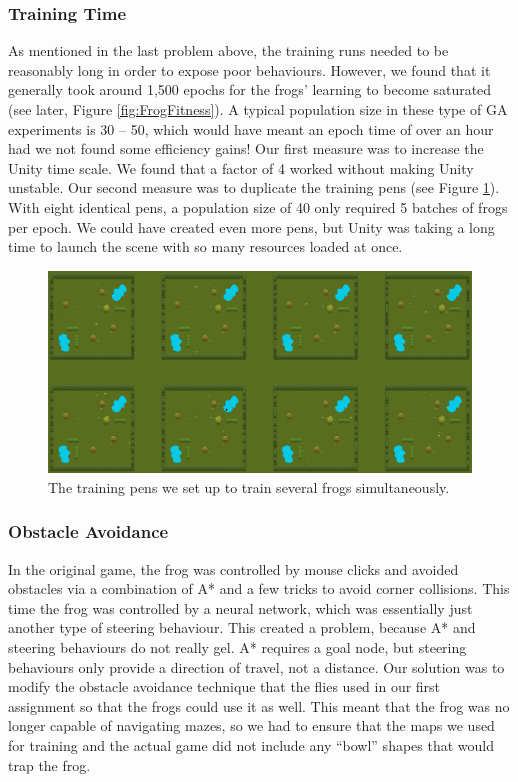 \subsubsection{Training Time}
As mentioned in the last problem above, the training runs needed to be reasonably long in order to expose poor behaviours. However, we found that it generally took around 1,500 epochs for the frogs' learning to become saturated (see later, Figure \ref{fig:FrogFitness}). A typical population size in these type of GA experiments is 30 -- 50, which would have meant an epoch time of over an hour had we not found some efficiency gains! Our first measure was to increase the Unity time scale. We found that a factor of 4 worked without making Unity unstable. Our second measure was to duplicate the training pens (see Figure \ref{fig:TrainingPens}). With eight identical pens, a population size of 40 only required 5 batches of frogs per epoch. We could have created even more pens, but Unity was taking a long time to launch the scene with so many resources loaded at once.

\begin{figure}[!htbp]
    \centering
    \includegraphics[scale=0.3]{Figs/TrainingPens.png}
    \caption{The training pens we set up to train several frogs simultaneously.}
    \label{fig:TrainingPens}
\end{figure}

\subsubsection{Obstacle Avoidance}
In the original game, the frog was controlled by mouse clicks and avoided obstacles via a combination of A* and a few tricks to avoid corner collisions. This time the frog was controlled by a neural network, which was essentially just another type of steering behaviour. This created a problem, because A* and steering behaviours do not really gel. A* requires a goal node, but steering behaviours only provide a direction of travel, not a distance. Our solution was to modify the obstacle avoidance technique that the flies used in our first assignment so that the frogs could use it as well. This meant that the frog was no longer capable of navigating mazes, so we had to ensure that the maps we used for training and the actual game did not include any ``bowl'' shapes that would trap the frog.

